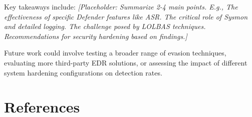 \documentclass{ULBreport}
\begin{document}
Key takeaways include: \textit{[Placeholder: Summarize 2-4 main points. E.g., The effectiveness of specific Defender features like ASR. The critical role of Sysmon and detailed logging. The challenge posed by LOLBAS techniques. Recommendations for security hardening based on findings.]}

Future work could involve testing a broader range of evasion techniques, evaluating more third-party EDR solutions, or assessing the impact of different system hardening configurations on detection rates.

\section*{References}
\end{document}
